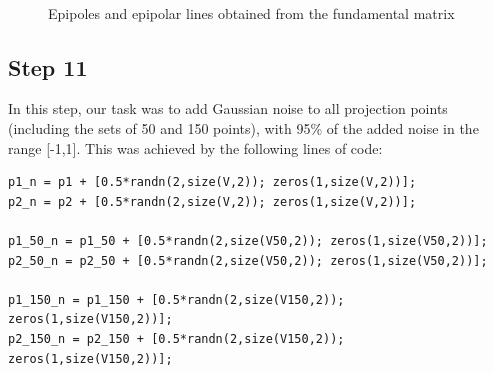 \documentclass[peerreview,11pt]{IEEEtran}
\begin{document}
\begin{figure}[ht]
	\centering

	~
	\\

	\caption{Epipoles and epipolar lines obtained from the fundamental matrix}
	\label{fig:epip_clean}
\end{figure}



\subsection{Step 11}

In this step, our task was to add Gaussian noise to all projection points (including the sets of 50 and 150 points), with 95\% of the added noise in the range [-1,1]. This was achieved by the following lines of code:

\begin{verbatim}
p1_n = p1 + [0.5*randn(2,size(V,2)); zeros(1,size(V,2))];
p2_n = p2 + [0.5*randn(2,size(V,2)); zeros(1,size(V,2))];

p1_50_n = p1_50 + [0.5*randn(2,size(V50,2)); zeros(1,size(V50,2))];
p2_50_n = p2_50 + [0.5*randn(2,size(V50,2)); zeros(1,size(V50,2))];

p1_150_n = p1_150 + [0.5*randn(2,size(V150,2)); zeros(1,size(V150,2))];
p2_150_n = p2_150 + [0.5*randn(2,size(V150,2)); zeros(1,size(V150,2))];
\end{verbatim}
\end{document}
